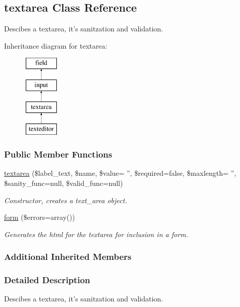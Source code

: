 \hypertarget{classtextarea}{\subsection{textarea Class Reference}
\label{classtextarea}
}


Descibes a textarea, it's sanitzation and validation.  


Inheritance diagram for textarea\-:\begin{figure}[H]
\begin{center}
\leavevmode
\includegraphics[height=4.000000cm]{classtextarea}
\end{center}
\end{figure}
\subsubsection*{Public Member Functions}
\begin{DoxyCompactItemize}
\item 
\hyperlink{classtextarea_a711ac3a17f0e150fd9a0c73c7633e1a1}{textarea} (\$label\-\_\-text, \$name, \$value= '', \$required=false, \$maxlength= '', \$sanity\-\_\-func=null, \$valid\-\_\-func=null)
\begin{DoxyCompactList}\small\item\em Constructor, creates a text\-\_\-area object. \end{DoxyCompactList}\item 
\hyperlink{classtextarea_a3e3d02a7c0ff76c86f6b987e1193ca6a}{form} (\$errors=array())
\begin{DoxyCompactList}\small\item\em Generates the html for the textarea for inclusion in a form. \end{DoxyCompactList}\end{DoxyCompactItemize}
\subsubsection*{Additional Inherited Members}


\subsubsection{Detailed Description}
Descibes a textarea, it's sanitzation and validation. 

